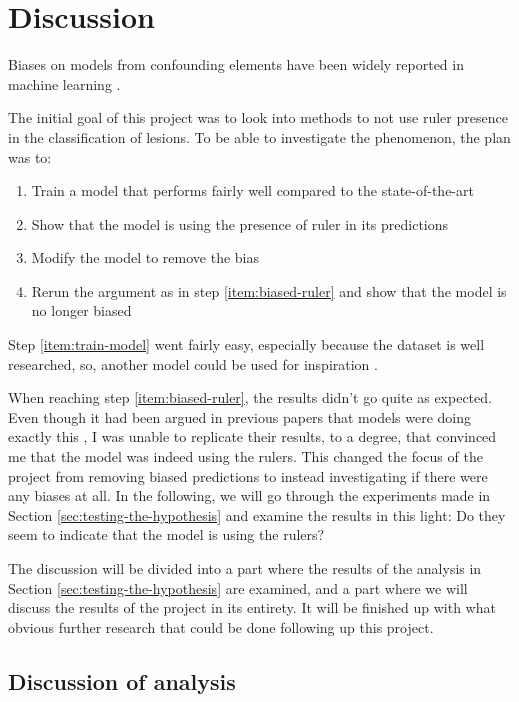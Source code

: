 \chapter{Discussion}
Biases on models from confounding elements have been widely reported in machine learning
\cite{DeConstructing_Bias_on_Skin_Lesion_Datasets_2019, Towards_Explainable_Classifiers_Using_the_Counterfactual_Approach_2019, debias-not-so-fast, interps-are-useful}.

The initial goal of this project was to look into methods to not use ruler presence in the
classification of lesions.
To be able to investigate the phenomenon, the plan was to:
\begin{enumerate}
    \item Train a model that performs fairly well compared to the state-of-the-art \label{item:train-model}
    \item Show that the model is using the presence of ruler in its predictions \label{item:biased-ruler}
    \item Modify the model to remove the bias
    \item Rerun the argument as in step \ref{item:biased-ruler} and show that the model is no longer biased
\end{enumerate}
Step \ref{item:train-model} went fairly easy, especially because the dataset is well researched,
so, another model could be used for inspiration \cite{kaggle-97-model}.

When reaching step \ref{item:biased-ruler}, the results didn't go quite as expected.
Even though it had been argued in previous papers that models were doing exactly this
\cite{debias-not-so-fast,interps-are-useful}, I was unable to replicate their results,
to a degree, that convinced me that the model was indeed using the rulers.
This changed the focus of the project from removing biased predictions to instead investigating
if there were any biases at all.
In the following, we will go through the experiments made in Section \ref{sec:testing-the-hypothesis} and
examine the results in this light: Do they seem to indicate that the model is using the rulers?

The discussion will be divided into a part where the results of the analysis in Section \ref{sec:testing-the-hypothesis}
are examined, and a part where we will discuss the results of the project in its entirety.
It will be finished up with what obvious further research that could be done following up this project.

\section{Discussion of analysis}
